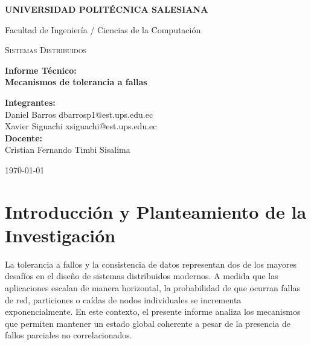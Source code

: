\documentclass[12pt,letterpaper]{article}
\begin{document}
\begin{titlepage}
    \centering
    \vspace*{2cm}
    {\large \textbf{UNIVERSIDAD POLITÉCNICA SALESIANA} \par}
    {\large Facultad de Ingeniería / Ciencias de la Computación \par}
    \vspace{1.5cm}
    {\scshape\Large Sistemas Distribuidos \par}
    \vspace{1cm}
    {\huge\bfseries Informe Técnico: \\ Mecanismos de tolerancia a fallas \par}
    \vspace{0.5cm}

    \vspace{2cm}
    \textbf{Integrantes:}\\
    Daniel Barros dbarrosp1@est.ups.edu.ec \\
    Xavier Siguachi xsiguachi@est.ups.edu.ec \\
    \vspace{1.5cm}
    \textbf{Docente:}\\
    Cristian Fernando Timbi Sisalima \\
    \vfill
    {\large \today \par}
\end{titlepage}

\newpage
\tableofcontents
\newpage

\section{Introducción y Planteamiento de la Investigación}
\label{sec:introduccion}

La tolerancia a fallos y la consistencia de datos representan dos de los mayores desafíos en el diseño de sistemas distribuidos modernos. A medida que las aplicaciones escalan de manera horizontal, la probabilidad de que ocurran fallas de red, particiones o caídas de nodos individuales se incrementa exponencialmente. En este contexto, el presente informe analiza los mecanismos que permiten mantener un estado global coherente a pesar de la presencia de fallos parciales no correlacionados.
\end{document}
